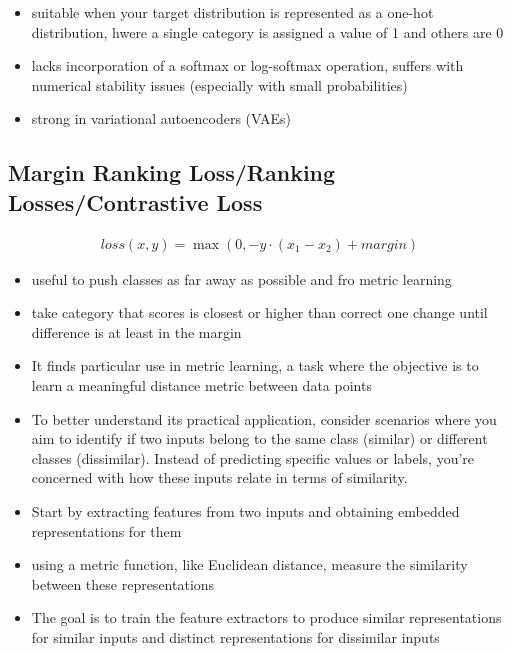 \documentclass[11pt]{article}
\begin{document}
\begin{itemize}
    \item suitable when your target distribution is represented as a one-hot distribution, hwere a single category is assigned a value of 1 and others are 0
    \item lacks incorporation of a softmax or log-softmax operation, suffers with numerical stability issues (especially with small probabilities)
    \item strong in variational autoencoders (VAEs)
\end{itemize}

\subsection{Margin Ranking Loss/Ranking Losses/Contrastive Loss}

\begin{definition}\label{eq:Marign-Ranking-Loss}
    \begin{align*}
        loss(x,y)=\max(0,-y \cdot (x_1 - x_2) + margin)
    \end{align*}
\end{definition}

\begin{itemize}
    \item useful to push classes as far away as possible and fro metric learning
    \item take category that scores is closest or higher than correct one change until difference is at least in the margin
    \item It finds particular use in metric learning, a task where the objective is to learn a meaningful distance metric between data points
    \item To better understand its practical application, consider scenarios where you aim to identify if two inputs belong to the same class (similar) or different classes (dissimilar). Instead of predicting specific values or labels, you're concerned with how these inputs relate in terms of similarity.
    \item Start by extracting features from two inputs and obtaining embedded representations for them
    \item using a metric function, like Euclidean distance, measure the similarity between these representations 
    \item The goal is to train the feature extractors to produce similar representations for similar inputs and distinct    representations for dissimilar inputs
\end{itemize}
\end{document}

